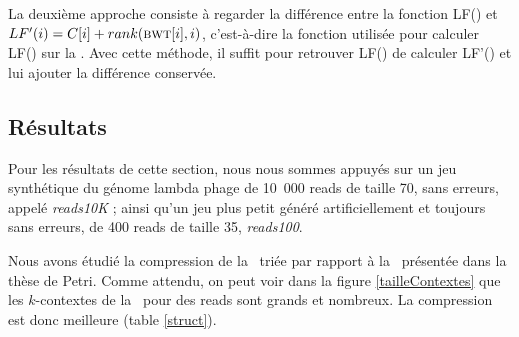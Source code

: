 La deuxième approche consiste à regarder la différence entre la fonction LF() et $LF'(i) = C[i] + rank(\textsc{bwt}[i], i)$, c'est-à-dire la fonction utilisée pour calculer LF() sur la \bwt. Avec cette méthode, il suffit pour retrouver LF() de calculer LF'() et lui ajouter la différence conservée.



%

%
%
%

\subsection{Résultats} 


Pour les résultats de cette section, nous nous sommes appuyés sur un jeu synthétique du génome lambda phage de 10~000 reads de taille 70, sans erreurs, appelé \textit{reads10K} ; ainsi qu'un jeu plus petit généré artificiellement et toujours sans erreurs, de 400 reads de taille 35, \textit{reads100}.

Nous avons étudié la compression de la \kbwt\ triée par rapport à la \kbwt\ présentée dans la thèse de Petri. Comme attendu, on peut voir dans la figure \ref{tailleContextes} que les $k$-contextes de la \kbwt\ pour des reads sont grands et nombreux. La compression est donc meilleure (table \ref{struct}).

